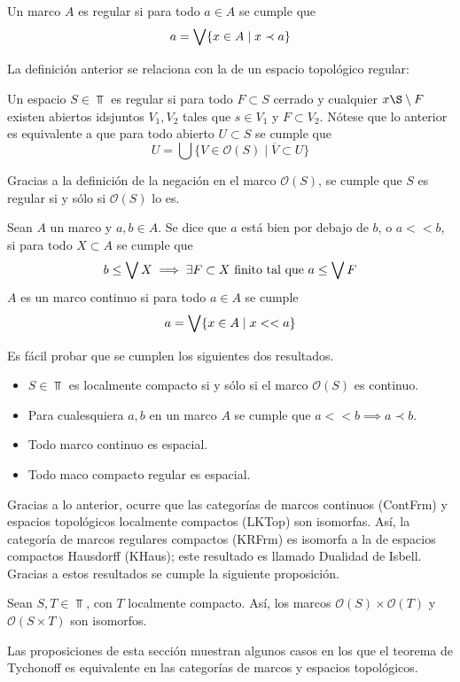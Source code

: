 \begin{definition}
Un marco $A$ es regular si para todo $a\in A$ se cumple que
$$a=\bigvee\{x\in A \mid x\prec a\}$$
\end{definition}
La definición anterior se relaciona con la de un espacio topológico regular:
\begin{definition}
    Un espacio $S\in\Top$ es regular si para todo $F\subset S$ cerrado y cualquier $x\S\setminus F$ existen abiertos idsjuntos $V_1, V_2$ tales que $s\in V_1$ y $F\subset V_2$.
    Nótese que lo anterior es equivalente a que para todo abierto $U\subset S$ se cumple que
    $$U=\bigcup \{V \in \mathcal{O}(S) \mid \overline{V}\subset U\}$$
\end{definition}
Gracias a la definición de la negación en el marco $\mathcal{O}(S)$, se cumple que $S$ es regular si y sólo si $\mathcal{O}(S)$ lo es.
\begin{definition}
    Sean $A$ un marco y $a,b\in A$. Se dice que $a$ está bien por debajo de $b$, o $a<<b$, si para todo $X\subset A$ se cumple que
    $$b\leq \bigvee X\implies \exists F\subset X \ \text{finito tal que} \ a\leq \bigvee F$$
    $A$ es un marco continuo si para todo $a\in A$ se cumple
    $$a=\bigvee\{x\in A\mid x<<a\}$$
\end{definition}
Es fácil probar que se cumplen los siguientes dos resultados.
\begin{lemma}
\begin{itemize}
    \item $S\in\Top$ es localmente compacto si y sólo si el marco $\mathcal{O}(S)$ es continuo.
    \item Para cualesquiera $a,b$ en un marco $A$ se cumple que $a<<b\implies a\prec b$.
    \item Todo marco continuo es espacial.
    \item Todo maco compacto regular es espacial.
\end{itemize}
\end{lemma}
Gracias a lo anterior, ocurre que las categorías de marcos continuos (ContFrm) y espacios topológicos localmente compactos (LKTop) son isomorfas. Así, la categoría de marcos regulares compactos (KRFrm) es isomorfa a la de espacios compactos Hausdorff (KHaus); este resultado es llamado Dualidad de Isbell.
Gracias a estos resultados se cumple la siguiente proposición.
\begin{proposition}
Sean $S,T\in\Top$, con $T$ localmente compacto. Así, los marcos $\mathcal{O}(S)\times \mathcal{O}(T)$ y $\mathcal{O}(S\times T)$ son isomorfos.
\end{proposition}
Las proposiciones de esta sección muestran algunos casos en los que el teorema de Tychonoff es equivalente en las categorías de marcos y espacios topológicos.

